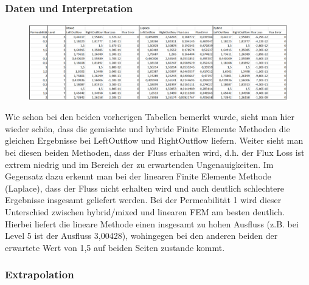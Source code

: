 \subsubsection{Daten und Interpretation}
\begin{figure}[H]
	\centering
		\includegraphics[width=\textwidth]{../../19/blatt5tabelle.png} 
\end{figure}
Wie schon bei den beiden vorherigen Tabellen bemerkt wurde, sieht man hier wieder schön, dass die gemischte und hybride Finite Elemente Methoden die gleichen Ergebnisse bei LeftOutflow und RightOutflow liefern. \newline
Weiter sieht man bei diesen beiden Methoden, dass der Fluss erhalten wird, d.h. der Flux Loss ist extrem niedrig und im Bereich der zu erwartenden Ungenauigkeiten. \newline Im Gegensatz dazu erkennt man bei der linearen Finite Elemente Methode (Laplace), dass der Fluss nicht erhalten wird und auch deutlich schlechtere Ergebnisse insgesamt geliefert werden. \newline
Bei der Permeabilität 1 wird dieser Unterschied zwischen hybrid/mixed und linearen FEM am besten deutlich. Hierbei liefert die lineare Methode einen insgesamt zu hohen Ausfluss (z.B. bei Level 5 ist der Ausfluss 3,00428), wohingegen bei den anderen beiden der erwartete Wert von 1,5 auf beiden Seiten zustande kommt. 

\subsubsection{Extrapolation}

